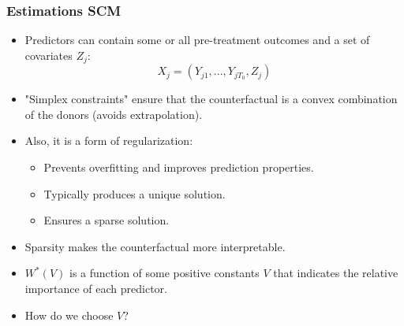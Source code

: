 \documentclass[xcolor=svgnames,t]{beamer}
\newcommand{\witem}{\item[\textcolor{white}{$\bullet$}]}
\begin{document}
\begin{frame}
    \frametitle{Estimations SCM}
    \begin{itemize}
        \item <1-> Predictors can contain some or all pre-treatment outcomes and a set of  covariates $Z_j$:
        $$X_j=(Y_{j1},..., Y_{jT_0}, Z_j)$$
        \item<1-> "Simplex constraints" ensure that the counterfactual is a convex combination of the donors (avoids extrapolation).
        \item<2-> Also, it is a form of regularization:
        \begin{itemize}
            \item<3-> Prevents overfitting and improves prediction properties.
            \item<4-> Typically produces a unique solution.
            \item<5-> Ensures a sparse solution.
        \end{itemize}
        \item<6-> Sparsity makes the counterfactual more interpretable.
        \item <7-> $W^*(V)$ is a function of some positive constants $V$ that indicates the relative importance of each predictor.
        \witem <8-> \begin{center}
            How do we choose $V$? 
        \end{center}
    \end{itemize}
\end{frame}
\end{document}
